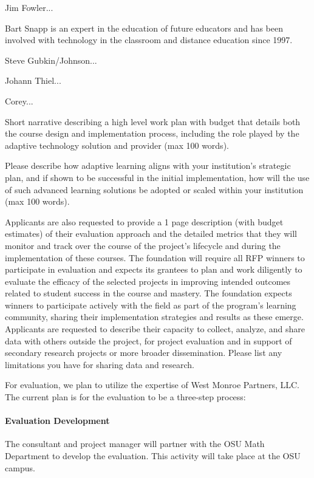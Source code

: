 Jim Fowler...

Bart Snapp is an expert in the education of future educators and has
been involved with technology in the classroom and distance education
since 1997.

Steve Gubkin/Johnson... 

Johann Thiel...

Corey...




\begin{question}
Short narrative describing a high level work plan with budget
that details both the course design and implementation process,
including the role played by the adaptive technology solution and
provider (max 100 words).
\end{question}


\begin{question}
Please describe how adaptive learning aligns with your
institution’s strategic plan, and if shown to be successful in the
initial implementation, how will the use of such advanced learning
solutions be adopted or scaled within your institution (max 100
words).
\end{question}


\begin{question}
Applicants are also requested to provide a 1 page description
(with budget estimates) of their evaluation approach and the
detailed metrics that they will monitor and track over the course of
the project’s lifecycle and during the implementation of these
courses. The foundation will require all RFP winners to participate
in evaluation and expects its grantees to plan and work diligently
to evaluate the efficacy of the selected projects in improving
intended outcomes related to student success in the course and
mastery. The foundation expects winners to participate actively with
the field as part of the program’s learning community, sharing their
implementation strategies and results as these emerge. Applicants
are requested to describe their capacity to collect, analyze, and
share data with others outside the project, for project evaluation
and in support of secondary research projects or more broader
dissemination. Please list any limitations you have for sharing data
and research.
\end{question}

For evaluation, we plan to utilize the expertise of West Monroe
Partners, LLC. The current plan is for the evaluation to be a three-step process:
\paragraph{Evaluation Development} The consultant and project
  manager will partner with the OSU Math Department to develop the
  evaluation.  This activity will take place at the OSU campus.
